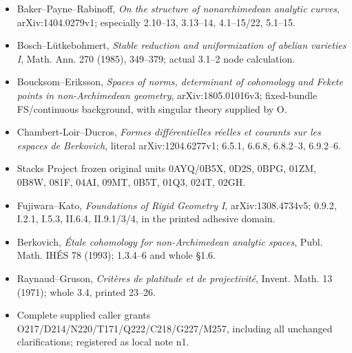\documentclass[
  11pt,
]{article}
\providecommand{\tightlist}{%
  \setlength{\itemsep}{0pt}\setlength{\parskip}{0pt}}
\begin{document}
\begin{itemize}
\tightlist
\item
  Baker--Payne--Rabinoff, \emph{On the structure of nonarchimedean
  analytic curves}, arXiv:1404.0279v1; especially 2.10--13, 3.13--14,
  4.1--15/22, 5.1--15.
\item
  Bosch--Lütkebohmert, \emph{Stable reduction and uniformization of
  abelian varieties I}, Math. Ann. 270 (1985), 349--379; actual 3.1--2
  node calculation.
\item
  Boucksom--Eriksson, \emph{Spaces of norms, determinant of cohomology
  and Fekete points in non-Archimedean geometry}, arXiv:1805.01016v3;
  fixed-bundle FS/continuous background, with singular theory supplied
  by O.
\item
  Chambert-Loir--Ducros, \emph{Formes différentielles réelles et
  courants sur les espaces de Berkovich}, literal arXiv:1204.6277v1;
  6.5.1, 6.6.8, 6.8.2--3, 6.9.2--6.
\item
  Stacks Project frozen original units 0AYQ/0B5X, 0D2S, 0BPG, 01ZM,
  0B8W, 081F, 04AI, 09MT, 0B5T, 01Q3, 024T, 02GH.
\item
  Fujiwara--Kato, \emph{Foundations of Rigid Geometry I},
  arXiv:1308.4734v5; 0.9.2, I.2.1, I.5.3, II.6.4, II.9.1/3/4, in the
  printed adhesive domain.
\item
  Berkovich, \emph{Étale cohomology for non-Archimedean analytic
  spaces}, Publ. Math. IHÉS 78 (1993); 1.3.4--6 and whole §1.6.
\item
  Raynaud--Gruson, \emph{Critères de platitude et de projectivité},
  Invent. Math. 13 (1971); whole 3.4, printed 23--26.
\item
  Complete supplied caller grants
  O217/D214/N220/T171/Q222/C218/G227/M257, including all unchanged
  clarifications; registered as local note n1.
\end{itemize}
\end{document}
